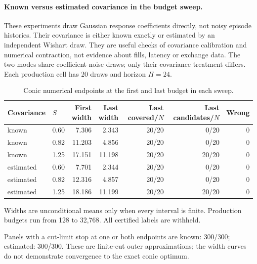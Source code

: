 \documentclass[10pt,twocolumn,letterpaper]{article}
\theoremstyle{definition}
\theoremstyle{remark}
\begin{document}
\paragraph{Known versus estimated covariance in the budget sweep.}
These experiments draw Gaussian response coefficients directly, not noisy
episode histories. Their covariance is either known exactly or estimated by
an independent Wishart draw. They are useful checks of covariance calibration
and numerical contraction, not evidence about fills, latency or exchange data.
The two modes share coefficient-noise draws; only their covariance treatment
differs. Each production cell has 20 draws and horizon $H=24$.

\begin{table}[htbp]\centering\small
\caption{Conic numerical endpoints at the first and last budget in each sweep.}
\label{tab:corrective_sweep}
\begin{tabular*}{\textwidth}{@{\extracolsep{\fill}}llrrrrr@{}}
\toprule
Covariance & $S$ & \shortstack{First\\width} & \shortstack{Last\\width} & \shortstack{Last\\covered/$N$} & \shortstack{Last\\candidates/$N$} & Wrong \\
\midrule
known & 0.60 & 7.306 & 2.343 & 20/20 & 0/20 & 0 \\
known & 0.82 & 11.203 & 4.856 & 20/20 & 0/20 & 0 \\
known & 1.25 & 17.151 & 11.198 & 20/20 & 20/20 & 0 \\
estimated & 0.60 & 7.701 & 2.344 & 20/20 & 0/20 & 0 \\
estimated & 0.82 & 12.316 & 4.857 & 20/20 & 0/20 & 0 \\
estimated & 1.25 & 18.186 & 11.199 & 20/20 & 20/20 & 0 \\
\bottomrule\end{tabular*}
\par\smallskip\begin{minipage}{\textwidth}\footnotesize Widths are unconditional means only when every interval is finite. Production budgets run from 128 to 32,768. All certified labels are withheld.\end{minipage}
\end{table}


Panels with a cut-limit stop at one or both endpoints are known: 300/300; estimated: 300/300. These are finite-cut outer approximations; the width curves do not demonstrate convergence to the exact conic optimum.
\end{document}

